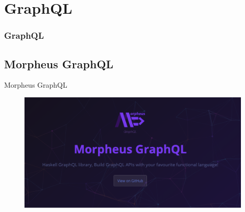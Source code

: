\section{GraphQL}
\begin{frame}{}
    \frametitle{GraphQL}
\end{frame}


\subsection{Morpheus GraphQL}
\begin{frame}{Morpheus GraphQL}
    \begin{figure}
        \centering
        \includegraphics[width=1.1\textwidth]{assets/img/morpheus-graphql-bg.png}
    \end{figure}
\end{frame}